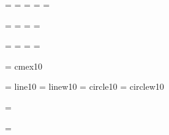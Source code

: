  \font\svtnrm  = \@rm{}
 \font\svtnit  = \@it{}
 \@loadsy{}
 \font\svtnbf  = \@bf{}
 \@font{}
 \@font{}
 \@font{}
 \@font{}
 \font\svtnms  = \@ms{}
 \@loadcmsy{}
 \@loadcmmi{}
 \font\svtnly  = \@lasyten{}

 \font\twtyrm  = \@rm{}
 \font\twtyit  = \@it{}
 \@loadsy{}
 \@font{}
 \@font{}
 \@font{}
 \@font{}
 \@font{}
 \font\twtyms  = \@ms{}
 \@loadcmsy{}
 \@loadcmmi{}
 \font\twtyly  = \@lasyten {}

 \font\twfvrm  = \@rm{}
 \font\twfvit  = \@it{}
 \@loadsy{}
 \@font{}
 \@font{}
 \@font{}
 \@font{}
 \@font{}
 \font\twfvms  = \@ms{}
 \@loadcmsy{}
 \@loadcmmi{}
 \font\twfvly  = \@lasyten{}

 \font\tenex   = cmex10

\if@uselasy
 \font\tenln    = line10
 \font\tenlnw   = linew10
 \font\tencirc  = circle10
 \font\tencircw = circlew10

 \ifnum{}\tenln=\tencirc \else 
   \immediate{}\fi
 \ifnum{}\tenlnw=\tencircw \else 
   \immediate{}\fi
\fi

\def\rm{\protect\prm}
\def\it{\protect\pit}
\def\bf{\protect\pbf}
\def\sl{\protect\psl}
\def\sf{\protect\psf}
\def\sc{\protect\psc}
\def\tt{\protect\ptt}


\def\hexnumber@#1{\ifnum#1<10 \number#1\else
 \ifnum#1=10 A\else\ifnum#1=11 B\else\ifnum#1=12 C\else
 \ifnum#1=13 D\else\ifnum#1=14 E\else
 \ifnum#1=15 F\fi\fi\fi\fi\fi\fi\fi}

